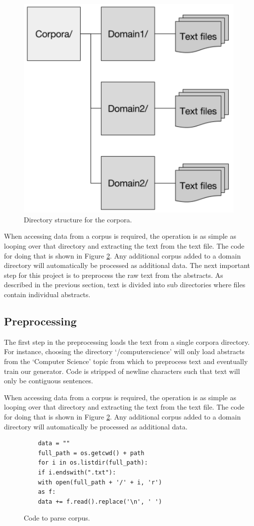 \documentclass[letterpaper, 10 pt, conference]{ieeeconf}  %
\begin{document}
\begin{figure}[!ht]
	\centering
	\includegraphics[width=.4\textwidth]{filestruct}
	\caption{Directory structure for the corpora.}
	\label{fig:Directorystructure}
\end{figure}


When accessing data from a corpus is required, the operation is as simple as looping over that directory and extracting the text from the text file. The code for doing that is shown in Figure \ref{fig:Codeparse}.  Any additional corpus added to a domain directory will automatically be processed as additional data. The next important step for this project is to preprocess the raw text from the abstracts. As described in the previous section, text is divided into sub directories where files contain individual abstracts. 

\subsection{Preprocessing}

The first step in the preprocessing loads the text from a single corpora directory. For instance, choosing the directory ‘/computerscience’ will only load abstracts from the ‘Computer Science’ topic from which to preprocess text and eventually train our generator. Code is stripped of newline characters such that text will only be contiguous sentences.

When accessing data from a corpus is required, the operation is as simple as looping over that directory and extracting the text from the text file. The code for doing that is shown in Figure \ref{fig:Codeparse}. Any additional corpus added to a domain directory will automatically be processed as additional data.

\begin{figure}[!ht]
	\begin{verbatim}
	data = ""
	full_path = os.getcwd() + path
	for i in os.listdir(full_path):
	if i.endswith(".txt"):
	with open(full_path + '/' + i, 'r')
	as f:
	data += f.read().replace('\n', ' ')
	\end{verbatim}

	\caption{Code to parse corpus.}
	\label{fig:Codeparse}
\end{figure}
\end{document}
